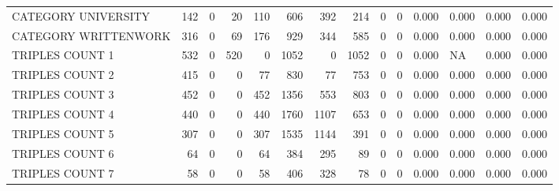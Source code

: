 \begin{tabular}{lrrrrrrrrrllll}
 CATEGORY UNIVERSITY      &             142 &             0 &              20 &             110 &             606 &  392 &  214 &    0 &    0 & 0.000 & 0.000 & 0.000 & 0.000 \\
 CATEGORY WRITTENWORK     &             316 &             0 &              69 &             176 &             929 &  344 &  585 &    0 &    0 & 0.000 & 0.000 & 0.000 & 0.000 \\
 TRIPLES COUNT 1          &             532 &             0 &             520 &               0 &            1052 &    0 & 1052 &    0 &    0 & 0.000 & NA    & 0.000 & 0.000 \\
 TRIPLES COUNT 2          &             415 &             0 &               0 &              77 &             830 &   77 &  753 &    0 &    0 & 0.000 & 0.000 & 0.000 & 0.000 \\
 TRIPLES COUNT 3          &             452 &             0 &               0 &             452 &            1356 &  553 &  803 &    0 &    0 & 0.000 & 0.000 & 0.000 & 0.000 \\
 TRIPLES COUNT 4          &             440 &             0 &               0 &             440 &            1760 & 1107 &  653 &    0 &    0 & 0.000 & 0.000 & 0.000 & 0.000 \\
 TRIPLES COUNT 5          &             307 &             0 &               0 &             307 &            1535 & 1144 &  391 &    0 &    0 & 0.000 & 0.000 & 0.000 & 0.000 \\
 TRIPLES COUNT 6          &              64 &             0 &               0 &              64 &             384 &  295 &   89 &    0 &    0 & 0.000 & 0.000 & 0.000 & 0.000 \\
 TRIPLES COUNT 7          &              58 &             0 &               0 &              58 &             406 &  328 &   78 &    0 &    0 & 0.000 & 0.000 & 0.000 & 0.000 \\
\hline
\end{tabular}